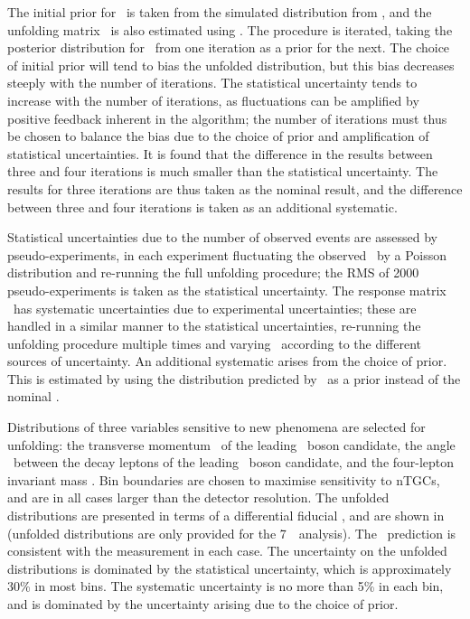The initial prior for \unfx\ is taken from the simulated distribution from
\mc, and the unfolding matrix \unfA\ is also estimated using \mcsim. The
procedure is iterated, taking the posterior distribution for \unfx\ from one iteration as a
prior for the next. The choice of initial prior will tend to bias the unfolded
distribution, but this bias decreases steeply with the number of iterations. The
statistical uncertainty tends to increase with the number of iterations, as
fluctuations can be amplified by positive feedback inherent in the algorithm;
the number of iterations must thus be chosen to balance the bias due to the
choice of prior and amplification of statistical uncertainties. It is found that
the difference in the results between three and four iterations is much smaller than
the statistical uncertainty. The results for three iterations are thus taken as
the nominal result, and the difference between three and four iterations is
taken as an additional systematic. 

Statistical uncertainties due to the number of observed events are assessed by
pseudo-experiments, in each experiment fluctuating the observed \unfy\ by a
Poisson distribution and re-running the full unfolding procedure; the RMS of 2000
pseudo-experiments is taken as the statistical uncertainty. 
The response matrix \unfA\ has systematic uncertainties due to experimental
uncertainties; these are handled in a similar manner to the statistical
uncertainties, re-running the unfolding procedure multiple times and varying 
\unfA\ according to the different sources of uncertainty. An
additional systematic arises from the choice of prior. This is estimated by
using the distribution predicted by \sherpa\ as a prior instead of the nominal
\powhegbox. 

Distributions of three variables sensitive to new phenomena are selected for
unfolding: the transverse momentum \ptZ\ of the leading \Z\ boson candidate, the
angle \deltaPhiLL\ between the decay leptons
of the leading \Z\ boson candidate, and the four-lepton invariant mass \mZZ. Bin
boundaries are chosen to maximise sensitivity to nTGCs, and are in all cases
larger than the detector resolution. The unfolded distributions are presented in
terms of a differential fiducial \cx, and are shown
in~ (unfolded distributions are only provided for
the 7~\tev\ analysis). The \sm\ prediction is consistent with the
measurement in each case. The uncertainty on the unfolded distributions is dominated by the
statistical uncertainty, which is approximately 30\% in most bins. The
systematic uncertainty is no more than 5\% in each bin, and is dominated by the
uncertainty arising due to the choice of prior.

